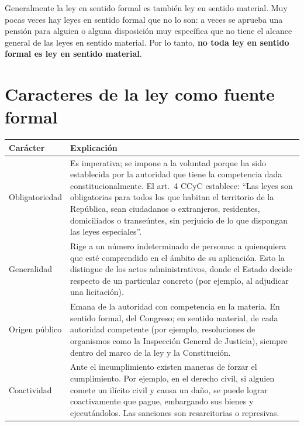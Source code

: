 \documentclass[12pt,oneside]{book}
\begin{document}
Generalmente la ley en sentido formal es también ley en sentido material. Muy pocas veces hay leyes en sentido formal que no lo son: a veces se aprueba una pensión para alguien o alguna disposición muy específica que no tiene el alcance general de las leyes en sentido material. Por lo tanto, \textbf{no toda ley en sentido formal es ley en sentido material}.

\section{Caracteres de la ley como fuente formal}

\begin{table}[H]
\centering
\begin{tabularx}{\textwidth}{>{\raggedright\arraybackslash}p{} >{\raggedright\arraybackslash}X}
\toprule
\textbf{Carácter} & \textbf{Explicación} \\
\midrule
Obligatoriedad &
Es imperativa; se impone a la voluntad porque ha sido establecida por la autoridad que tiene la competencia dada constitucionalmente. El art.~4 CCyC establece: ``Las leyes son obligatorias para todos los que habitan el territorio de la República, sean ciudadanos o extranjeros, residentes, domiciliados o transeúntes, sin perjuicio de lo que dispongan las leyes especiales''. \\
\addlinespace
Generalidad &
Rige a un número indeterminado de personas: a quienquiera que esté comprendido en el ámbito de su aplicación. Esto la distingue de los actos administrativos, donde el Estado decide respecto de un particular concreto (por ejemplo, al adjudicar una licitación). \\
\addlinespace
Origen público &
Emana de la autoridad con competencia en la materia. En sentido formal, del Congreso; en sentido material, de cada autoridad competente (por ejemplo, resoluciones de organismos como la Inspección General de Justicia), siempre dentro del marco de la ley y la Constitución. \\
\addlinespace
Coactividad &
Ante el incumplimiento existen maneras de forzar el cumplimiento. Por ejemplo, en el derecho civil, si alguien comete un ilícito civil y causa un daño, se puede lograr coactivamente que pague, embargando sus bienes y ejecutándolos. Las sanciones son resarcitorias o represivas. \\
\bottomrule
\end{tabularx}
\end{table}
\end{document}
